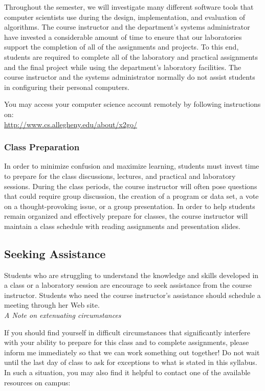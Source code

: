 Throughout the semester, we will investigate many different software tools that computer scientists use during the
design, implementation, and evaluation of algorithms.  The course instructor and the department's systems administrator
have invested a considerable amount of time to ensure that our laboratories support the completion of all of the
assignments and projects.  To this end, students are required to complete all of the laboratory and practical
assignments and the final project while using the department's laboratory facilities. The course instructor and the
systems administrator normally do not assist students in configuring their personal computers.

\noindent You may access your computer science account remotely by following instructions on:\\
{\url{http://www.cs.allegheny.edu/about/x2go/}}

\subsubsection*{Class Preparation}

In order to minimize confusion and maximize learning, students must invest time to prepare for the class discussions,
lectures, and practical and laboratory sessions. During the class periods, the course instructor will often pose  questions that could require group discussion, the creation of a program or data set, a vote on a thought-provoking issue, or a group presentation.  
In order to help students remain organized and effectively prepare for classes, the course instructor will maintain a class schedule with reading assignments and presentation slides. 

\subsection*{Seeking Assistance}

Students who are struggling to understand the knowledge and skills developed in a class or a laboratory
session are encourage to seek assistance from the course instructor. Students who need the course instructor's assistance should schedule a meeting through her Web site. \\

\noindent \emph{A Note on extenuating circumstances}

\noindent If you should find yourself in difficult circumstances that significantly interfere with your ability to prepare for this class and to complete assignments, please inform me immediately so that we can work something out together! Do not wait until the last day of class to ask for exceptions to what is stated in this syllabus. In such a situation, you may also find it helpful to contact one of the available resources on campus: \\

